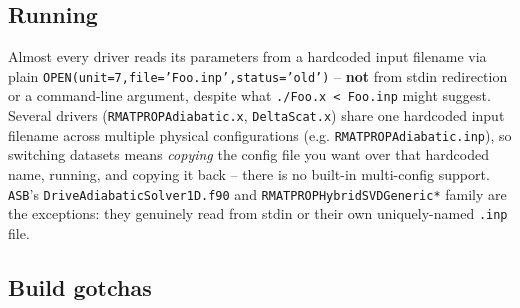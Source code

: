 \documentclass[11pt]{article}
\newcommand{\file}[1]{\texttt{#1}}
\begin{document}
\subsection{Running}

Almost every driver reads its parameters from a hardcoded input filename via plain
\texttt{OPEN(unit=7,file='Foo.inp',status='old')} -- \textbf{not} from stdin redirection or a
command-line argument, despite what \texttt{./Foo.x < Foo.inp} might suggest. Several drivers
(\file{RMATPROPAdiabatic.x}, \file{DeltaScat.x}) share one hardcoded input filename across
multiple physical configurations (e.g. \file{RMATPROPAdiabatic.inp}), so switching datasets means
\emph{copying} the config file you want over that hardcoded name, running, and copying it back --
there is no built-in multi-config support. \file{ASB}'s \file{DriveAdiabaticSolver1D.f90} and
\file{RMATPROPHybridSVDGeneric*} family are the exceptions: they genuinely read from stdin or
their own uniquely-named \texttt{.inp} file.

\subsection{Build gotchas}
\end{document}
